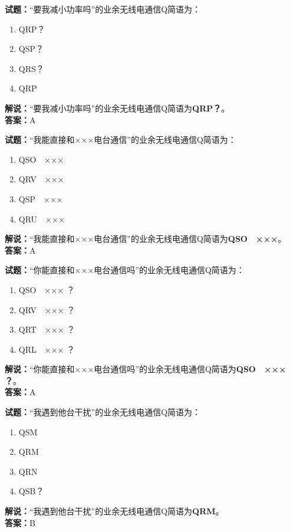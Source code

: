 \documentclass{ctexbook}
\begin{document}
\noindent\textbf{试题：}“要我减小功率吗”的业余无线电通信Q简语为：
\begin{enumerate}[leftmargin=3em]
\item QRP？
\item QSP？
\item QRS？
\item QRP
\end{enumerate}
\noindent\textbf{解说：}“要我减小功率吗”的业余无线电通信Q简语为\textbf{QRP？}。\\\noindent\textbf{答案：}A


\bigskip


\noindent\textbf{试题：}“我能直接和×××电台通信”的业余无线电通信Q简语为：
\begin{enumerate}[leftmargin=3em]
\item QSO　×××
\item QRV　×××
\item QSP　×××
\item QRU　×××
\end{enumerate}
\noindent\textbf{解说：}“我能直接和×××电台通信”的业余无线电通信Q简语为\textbf{QSO　×××}。\\\noindent\textbf{答案：}A


\bigskip


\noindent\textbf{试题：}“你能直接和×××电台通信吗”的业余无线电通信Q简语为：
\begin{enumerate}[leftmargin=3em]
\item QSO　××× ？
\item QRV　××× ？
\item QRT　××× ？
\item QRL　××× ？
\end{enumerate}
\noindent\textbf{解说：}“你能直接和×××电台通信吗”的业余无线电通信Q简语为\textbf{QSO　××× ？}。\\\noindent\textbf{答案：}A



\bigskip


\noindent\textbf{试题：}“我遇到他台干扰”的业余无线电通信Q简语为：
\begin{enumerate}[leftmargin=3em]
\item QSM
\item QRM
\item QRN
\item QSB？
\end{enumerate}
\noindent\textbf{解说：}“我遇到他台干扰”的业余无线电通信Q简语为\textbf{QRM}。\\\noindent\textbf{答案：}B
\end{document}
